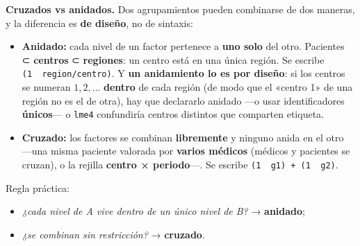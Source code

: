 \documentclass[
  letterpaper,
  DIV=11,
  numbers=noendperiod]{scrartcl}
\providecommand{\tightlist}{%
  \setlength{\itemsep}{0pt}\setlength{\parskip}{0pt}}\usepackage{longtable,booktabs,array}
\begin{document}
\textbf{Cruzados vs anidados.} Dos agrupamientos pueden combinarse de
dos maneras, y la diferencia es \textbf{de diseño}, no de sintaxis:

\begin{itemize}
\tightlist
\item
  \textbf{Anidado:} cada nivel de un factor pertenece a \textbf{uno
  solo} del otro. Pacientes ⊂ \textbf{centros} ⊂ \textbf{regiones}: un
  centro está en una única región. Se escribe
  \texttt{(1\ \textbar{}\ region/centro)}. Y \textbf{un anidamiento lo
  es por diseño}: si los centros se numeran \(1,2,\dots\)
  \textbf{dentro} de cada región (de modo que el «centro 1» de una
  región no es el de otra), hay que declararlo anidado ---o usar
  identificadores \textbf{únicos}--- o \texttt{lme4} confundiría centros
  distintos que comparten etiqueta.
\item
  \textbf{Cruzado:} los factores se combinan \textbf{libremente} y
  ninguno anida en el otro ---una misma paciente valorada por
  \textbf{varios médicos} (médicos y pacientes se cruzan), o la rejilla
  \textbf{centro × periodo}---. Se escribe
  \texttt{(1\ \textbar{}\ g1)\ +\ (1\ \textbar{}\ g2)}.
\end{itemize}

Regla práctica:

\begin{itemize}
\tightlist
\item
  \emph{¿cada nivel de A vive dentro de un único nivel de B?} →
  \textbf{anidado};
\item
  \emph{¿se combinan sin restricción?} → \textbf{cruzado}.
\end{itemize}
\end{document}
